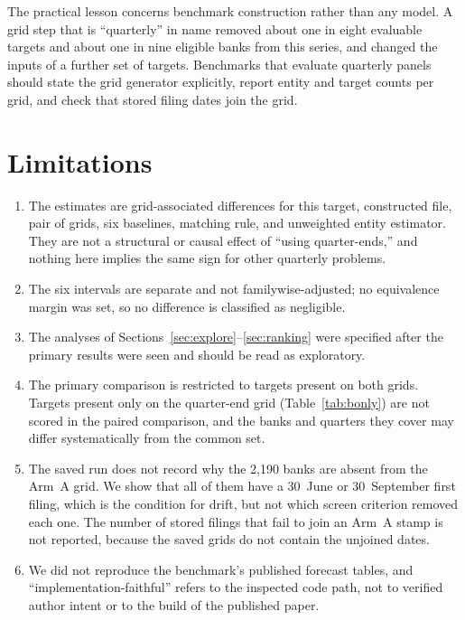 \documentclass[11pt]{article}
\begin{document}
The practical lesson concerns benchmark construction rather than any model. A grid step that is ``quarterly'' in name removed about one in eight evaluable targets and about one in nine eligible banks from this series, and changed the inputs of a further set of targets. Benchmarks that evaluate quarterly panels should state the grid generator explicitly, report entity and target counts per grid, and check that stored filing dates join the grid.

\section{Limitations}
\begin{enumerate}
  \item The estimates are grid-associated differences for this target, constructed file, pair of grids, six baselines, matching rule, and unweighted entity estimator. They are not a structural or causal effect of ``using quarter-ends,'' and nothing here implies the same sign for other quarterly problems.
  \item The six intervals are separate and not familywise-adjusted; no equivalence margin was set, so no difference is classified as negligible.
  \item The analyses of Sections~\ref{sec:explore}--\ref{sec:ranking} were specified after the primary results were seen and should be read as exploratory.
  \item The primary comparison is restricted to targets present on both grids. Targets present only on the quarter-end grid (Table~\ref{tab:bonly}) are not scored in the paired comparison, and the banks and quarters they cover may differ systematically from the common set.
  \item The saved run does not record why the 2,190 banks are absent from the Arm~A grid. We show that all of them have a 30~June or 30~September first filing, which is the condition for drift, but not which screen criterion removed each one. The number of stored filings that fail to join an Arm~A stamp is not reported, because the saved grids do not contain the unjoined dates.
  \item We did not reproduce the benchmark's published forecast tables, and ``implementation-faithful'' refers to the inspected code path, not to verified author intent or to the build of the published paper.
\end{enumerate}
\end{document}
